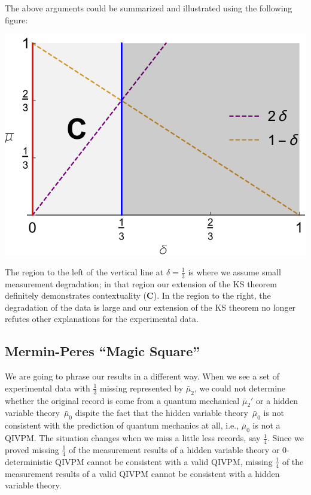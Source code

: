 \documentclass[english,reprint, aps, prl,superscriptaddress, showpacs,
showkeys, longbibliography, amsmath, amssymb, floatfix]{revtex4-1}
\theoremstyle{plain}
\theoremstyle{definition}
\begin{document}
The above arguments could be summarized and illustrated using the
following figure: 
\begin{center}
\includegraphics[scale=0.5]{prop_letter_ajhs_referee_response_nb} 
\par\end{center}

\noindent The region to the left of the vertical line at
$\delta=\frac{1}{3}$ is where we assume small measurement degradation;
in that region our extension of the KS theorem definitely demonstrates
contextuality ({\bf{\sf C}}). In the region to the right, the degradation of the data
is large and our extension of the KS theorem no longer refutes other
explanations for the experimental data.

\subsection*{Mermin-Peres ``Magic Square''}

We are going to phrase our results in a different way. When we see
a set of experimental data with $\frac{1}{3}$ missing represented
by $\bar{\mu}_{2}$, we could not determine whether the original record
is come from a quantum mechanical $\bar{\mu}_{2}'$ or a hidden variable
theory~$\bar{\mu}_{0}$ dispite the fact that the hidden variable
theory~$\bar{\mu}_{0}$ is not consistent with the prediction of
quantum mechanics at all, i.e., $\bar{\mu}_{0}$ is not a QIVPM. The
situation changes when we miss a little less records, say $\frac{1}{4}$.
Since we proved missing $\frac{1}{4}$ of the measurement results
of a hidden variable theory or $0$-deterministic QIVPM cannot be
consistent with a valid QIVPM, missing $\frac{1}{4}$ of the measurement
results of a valid QIVPM cannot be consistent with a hidden variable
theory.
\end{document}
